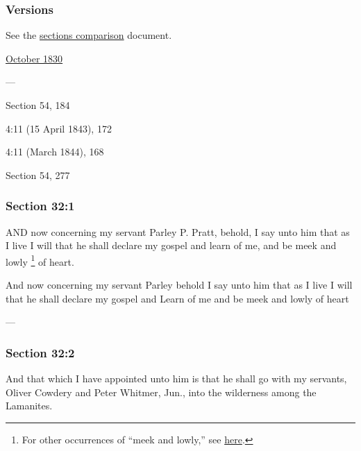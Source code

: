 	\subsubsection{Versions}
		\label{DC32-V}
		
		See the \href{https://drive.google.com/file/d/1goAvNz8jS4R8slYfMG_db55Ty2z_vmgK/view?usp=sharing}{sections comparison} document.
	
		\begin{compactdesc}
			\item[JSP] \hyperref[EMS-1830-JS-OCT-1830-A]{October 1830}
			\item[BC] ---
			\item[DC 1835] Section 54, 184
			\item[TS] 4:11 (15 April 1843), 172
			\item[MS] 4:11 (March 1844), 168
			\item[DC 1844] Section 54, 277
		\end{compactdesc}

	\subsubsection{Section 32:1} %
		\label{DC32-1}

		AND now concerning my servant Parley P. Pratt, behold, I say unto him that as I live I will that he shall declare my gospel and learn of me, and be meek and lowly%
			\footnote{%
				For other occurrences of ``meek and lowly,'' see \hyperref[MEEKNESS-PHRASES]{here}.
				}
		of heart.

		\begin{framed}
		\scriptsize
			\begin{compactdesc}
				\item[JSP] And now concerning my servant Parley behold I say unto him that as I live I will that he shall declare my gospel and Learn of me and be meek and lowly of heart
				\item[BC] ---
			\end{compactdesc}
		\end{framed}

	\subsubsection{Section 32:2} %
		\label{DC32-2}

		And that which I have appointed unto him is that he shall go with my servants, Oliver Cowdery and Peter Whitmer, Jun., into the wilderness among the Lamanites.

